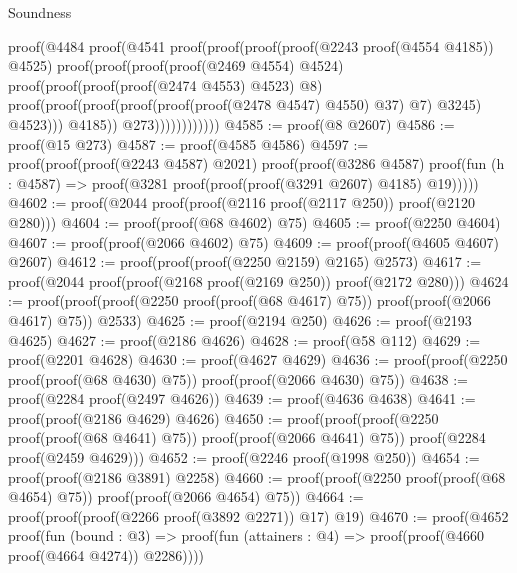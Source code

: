 \begin{lexlean}{Soundness}
\begin{coremodule}
                                  proof(@4484
                                      proof(@4541
                                          proof(proof(proof(proof(@2243 proof(@4554 @4185)) @4525)
                                                proof(proof(proof(proof(@2469 @4554) @4524)
                                                      proof(proof(proof(proof(@2474 @4553) @4523)
                                                            @8)
                                                          proof(proof(proof(proof(proof(proof(@2478
                                                                        @4547)
                                                                      @4550)
                                                                    @37)
                                                                  @7)
                                                                @3245)
                                                              @4523)))
                                                    @4185))
                                              @273))))))))))))
@4585 := proof(@8 @2607)
@4586 := proof(@15 @273)
@4587 := proof(@4585 @4586)
@4597 := proof(proof(proof(@2243 @4587) @2021)
      proof(proof(@3286 @4587)
          proof(fun (h : @4587) => proof(@3281 proof(proof(proof(@3291 @2607) @4185) @19)))))
@4602 := proof(@2044 proof(proof(@2116 proof(@2117 @250)) proof(@2120 @280)))
@4604 := proof(proof(@68 @4602) @75)
@4605 := proof(@2250 @4604)
@4607 := proof(proof(@2066 @4602) @75)
@4609 := proof(proof(@4605 @4607) @2607)
@4612 := proof(proof(proof(@2250 @2159) @2165) @2573)
@4617 := proof(@2044 proof(proof(@2168 proof(@2169 @250)) proof(@2172 @280)))
@4624 := proof(proof(proof(@2250 proof(proof(@68 @4617) @75)) proof(proof(@2066 @4617) @75)) @2533)
@4625 := proof(@2194 @250)
@4626 := proof(@2193 @4625)
@4627 := proof(@2186 @4626)
@4628 := proof(@58 @112)
@4629 := proof(@2201 @4628)
@4630 := proof(@4627 @4629)
@4636 := proof(proof(@2250 proof(proof(@68 @4630) @75)) proof(proof(@2066 @4630) @75))
@4638 := proof(@2284 proof(@2497 @4626))
@4639 := proof(@4636 @4638)
@4641 := proof(proof(@2186 @4629) @4626)
@4650 := proof(proof(proof(@2250 proof(proof(@68 @4641) @75)) proof(proof(@2066 @4641) @75))
      proof(@2284 proof(@2459 @4629)))
@4652 := proof(@2246 proof(@1998 @250))
@4654 := proof(proof(@2186 @3891) @2258)
@4660 := proof(proof(@2250 proof(proof(@68 @4654) @75)) proof(proof(@2066 @4654) @75))
@4664 := proof(proof(proof(@2266 proof(@3892 @2271)) @17) @19)
@4670 := proof(@4652
      proof(fun (bound : @3) =>
        proof(fun (attainers : @4) => proof(proof(@4660 proof(@4664 @4274)) @2286))))

\end{coremodule}
\end{lexlean}
